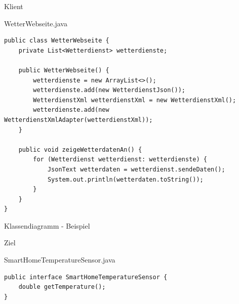 \begin{frame}[fragile]{Klient}
	\begin{exampleblock}{WetterWebseite.java}
 		\begin{lstlisting}
public class WetterWebseite {
	private List<Wetterdienst> wetterdienste;
	
	public WetterWebseite() {
		wetterdienste = new ArrayList<>();
		wetterdienste.add(new WetterdienstJson());
		WetterdienstXml wetterdienstXml = new WetterdienstXml();
		wetterdienste.add(new WetterdienstXmlAdapter(wetterdienstXml));
	}
	
	public void zeigeWetterdatenAn() {
		for (Wetterdienst wetterdienst: wetterdienste) {
			JsonText wetterdaten = wetterdienst.sendeDaten();
			System.out.println(wetterdaten.toString());
		}
	}
} 		    
 		\end{lstlisting}
 	\end{exampleblock}
\end{frame}


\begin{frame}{Klassendiagramm - Beispiel}
\end{frame}

\begin{frame}[fragile]{Ziel}
	\begin{exampleblock}{SmartHomeTemperatureSensor.java}
 		\begin{lstlisting}
public interface SmartHomeTemperatureSensor {
	double getTemperature();
}

 		\end{lstlisting}
 	\end{exampleblock}
\end{frame}

